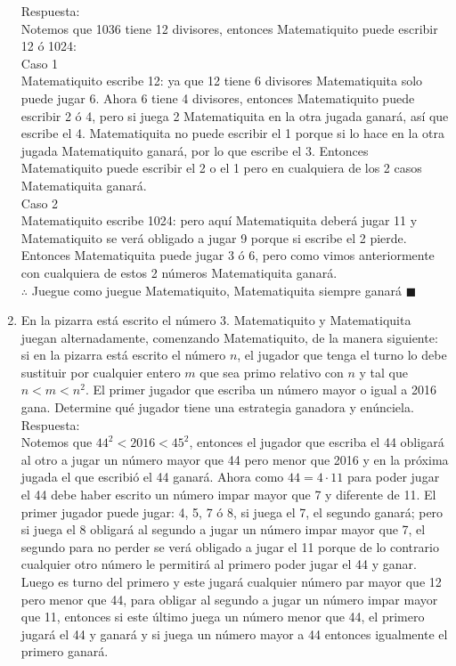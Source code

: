 \documentclass{book}
\begin{document}
\begin{enumerate}
			 Respuesta:\\
			 Notemos que 1036 tiene 12 divisores, entonces  Matematiquito puede escribir 12 ó 1024:\\
			 Caso 1\\
			 Matematiquito escribe 12: ya que 12 tiene 6 divisores  Matematiquita solo puede jugar 6. Ahora 6 tiene 4 divisores, entonces  Matematiquito puede escribir 2 ó 4, pero si juega 2  Matematiquita en la otra jugada ganará, así que escribe el 4.  Matematiquita no puede escribir el 1 porque si lo hace en la otra jugada  Matematiquito ganará, por lo que escribe el 3. Entonces  Matematiquito puede escribir el 2 o el 1 pero en cualquiera de los 2 casos  Matematiquita ganará. \\
			 Caso 2\\
			 Matematiquito escribe 1024: pero aquí Matematiquita deberá jugar 11 y Matematiquito se verá obligado a jugar 9 porque si escribe el 2 pierde. Entonces Matematiquita puede jugar 3 ó 6, pero como vimos anteriormente con cualquiera de estos 2 números Matematiquita ganará.\\
			 $\therefore$ Juegue como juegue Matematiquito, Matematiquita siempre ganará $\blacksquare$\\
			 \item En la pizarra está escrito el número 3. Matematiquito y Matematiquita juegan alternadamente, comenzando Matematiquito, de la manera siguiente: si en la pizarra está escrito el número $n$, el jugador que tenga el turno lo debe sustituir por cualquier entero $m$ que sea primo relativo con $n$ y tal que $n<m<n^2$. El primer jugador que escriba un número mayor o igual a 2016 gana. Determine qué jugador tiene una estrategia ganadora y enúnciela.
			 \\Respuesta:\\
			 	Notemos que $44^2<2016<45^2$, entonces el jugador que escriba el 44 obligará al otro a jugar un número mayor que 44 pero menor que 2016 y en la próxima jugada el que escribió el 44 ganará. Ahora como $44=4\cdot 11$ para poder jugar el 44 debe haber escrito un número impar mayor que 7 y diferente de 11. El primer jugador puede jugar: 4, 5, 7 ó 8, si juega el 7, el segundo ganará; pero si juega el 8 obligará al segundo a jugar un número impar mayor que 7, el segundo para no perder se verá obligado a jugar el 11 porque de lo contrario cualquier otro número le permitirá al primero poder  jugar el 44 y ganar. Luego es turno del primero y este jugará cualquier número par mayor que 12 pero menor que 44, para obligar al segundo a jugar un número impar mayor que 11, entonces si este último juega un número menor que 44, el primero jugará el 44 y ganará y si juega un número mayor a 44 entonces igualmente el primero ganará.\\ 

\end{enumerate}
\end{document}

